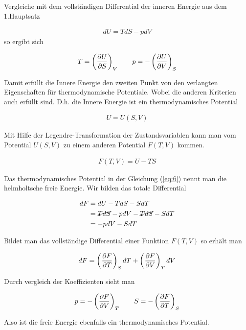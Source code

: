 Vergleiche mit dem vollständigen Differential der inneren Energie aus dem 1.Hauptsatz

\begin{align}
  \label{eq:3}
  dU = TdS - pdV
\end{align}
so ergibt sich

\begin{align}
  \label{eq:4}
  T = \left(\pdiff U_S \right)_V \qquad p = - \left(\pdiff U_V \right)_S
\end{align}

Damit erfüllt die Innere Energie den zweiten Punkt von den verlangten Eigenschaften für thermodynamische Potentiale. Wobei die anderen Kriterien auch erfüllt sind. D.h. die Innere Energie ist ein thermodynamisches Potential

\begin{align}
  \label{eq:5}
  U=U(S,V)
\end{align}

Mit Hilfe der Legendre-Transformation der Zustandsvariablen kann man vom Potential \(U(S,V)\) zu einem anderen Potential \(F(T,V)\) kommen.

\begin{align}
  \label{eq:6}
 F(T,V) = U - TS
\end{align}

Das thermodynamisches Potential in der Gleichung (\ref{eq:6}) nennt man die helmholtsche freie Energie. Wir bilden das totale Differential

\begin{align}
  \label{eq:8}
  dF &= dU - TdS - SdT \notag\\
&=  \cancel{TdS} - pdV - \cancel{TdS} - SdT \notag\\
&=-pdV - SdT
\end{align}

Bildet man das vollständige Differential einer Funktion \(F(T,V)\) so erhält man

\begin{align}
  \label{eq:7}
  dF = \left(\pdiff F_T \right)_S dT +  \left(\pdiff F_V \right)_T dV
\end{align}

Durch vergleich der Koeffizienten sieht man

\begin{align}
  \label{eq:9}
  p = - \left(\pdiff F_V \right)_T  \qquad S = - \left(\pdiff F_T \right)_S 
\end{align}

Also ist die freie Energie ebenfalls ein thermodynamisches Potential.



